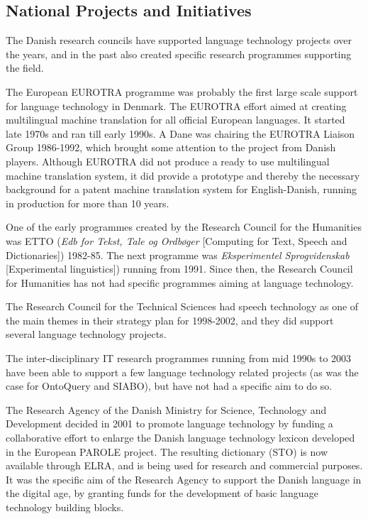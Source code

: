 \begin{multicols}{2}
\subsection{National Projects and Initiatives}

 The Danish research councils have supported language technology projects over the years, and in the past also created specific research programmes supporting the field.

The European EUROTRA programme was probably the first large scale support for language technology in Denmark. The EUROTRA effort aimed at creating multilingual machine translation for all official European languages. It started late 1970s and ran till early 1990s. A Dane was chairing the EUROTRA Liaison Group 1986-1992, which brought some attention to the project from Danish players. Although EUROTRA did not produce a ready to use multilingual machine translation system, it did provide a prototype and thereby the necessary background for a patent machine translation system for English-Danish, running in production for more than 10 years.

One of the early programmes created by the Research Council for the Humanities was ETTO ({\it Edb for Tekst, Tale og Ordb\o ger} [Computing for Text, Speech and Dictionaries]) 1982-85. The next programme was {\it Eksperimentel Sprogvidenskab} [Experimental linguistics]) running from 1991. Since then, the Research Council for Humanities has not had specific programmes aiming at language technology.

The Research Council for the Technical Sciences had speech technology as one of the main themes in their strategy plan for 1998-2002, and they did support several language technology projects.

The inter-disciplinary IT research programmes running from mid 1990s to 2003 have been able to support a few language technology related projects (as was the case for OntoQuery and SIABO), but have not had a specific aim to do so.

The Research Agency of the Danish Ministry for Science, Technology and Development decided in 2001 to promote language technology by funding a collaborative effort to enlarge the Danish language technology lexicon developed in the European PAROLE project. The resulting dictionary (STO) is now available through ELRA, and is being used for research and commercial purposes. It was the specific aim of the Research Agency to support the Danish language in the digital age, by granting funds for the development of basic language technology building blocks.


\end{multicols}
